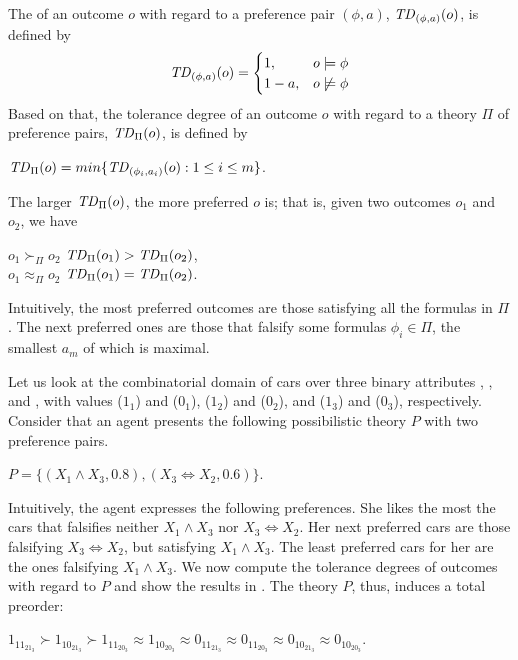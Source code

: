 The  of an outcome $o$ with regard to a preference 
pair $(\phi,a)$, $\mathit{TD}_{(\phi,a)}(o)$, is defined by
\[
 \mathit{TD}_{(\phi,a)}(o) =
  \begin{cases}
   1, & o \models \phi \\
   1-a, & o \not \models \phi
  \end{cases}
\]
Based on that, the tolerance degree of an outcome $o$ with regard to a
theory $\Pi$ of preference pairs, $\mathit{TD}_\Pi(o)$, is defined by 
\begin{center}
	$\mathit{TD}_\Pi(o)=min\{\mathit{TD}_{(\phi_i,a_i)}(o):1\leq i \leq m\}$.
\end{center}
The larger $\mathit{TD}_\Pi(o)$, the more preferred $o$ is; that is, 
given two outcomes $o_1$ and $o_2$, we have
\begin{center}
	$o_1 \succ_\Pi o_2$ \itiff $\mathit{TD}_\Pi(o_1) > \mathit{TD}_\Pi(o_2)$,\\
	$o_1 \approx_\Pi o_2$ \itiff $\mathit{TD}_\Pi(o_1) = \mathit{TD}_\Pi(o_2)$.
\end{center}
Intuitively, the most preferred outcomes are those satisfying
all the formulas in $\Pi$.
The next preferred ones are those that falsify some
formulas $\phi_i \in \Pi$, the smallest $a_m$ of which
is maximal.

Let us look at the combinatorial domain of cars 
over three binary attributes
, , and ,
with values  ($1_1$) and  ($0_1$),
 ($1_2$) and  ($0_2$), and
 ($1_3$) and  ($0_3$), respectively.
Consider that an agent presents the following possibilistic 
theory $P$ with two preference pairs.
\begin{center}
	$P = \{ (X_1\land X_3,0.8), (X_3 \Leftrightarrow X_2,0.6) \}$.
\end{center}
Intuitively, the agent expresses the following preferences.
She likes the most the cars that falsifies neither $X_1\land X_3$
nor $X_3 \Leftrightarrow X_2$.
Her next preferred cars are those falsifying $X_3 \Leftrightarrow X_2$,
but satisfying $X_1\land X_3$.
The least preferred cars for her are the ones falsifying
$X_1 \land X_3$.
We now compute the tolerance degrees of outcomes with regard to $P$
and show the results in .
The theory $P$, thus, induces a total preorder:
\begin{center}
	$1_11_21_3 \succ 1_10_21_3 \succ 1_11_20_3 \approx 1_10_20_3 \approx 
		0_11_21_3 \approx 0_11_20_3 \approx 0_10_21_3 \approx 0_10_20_3$.
\end{center}

